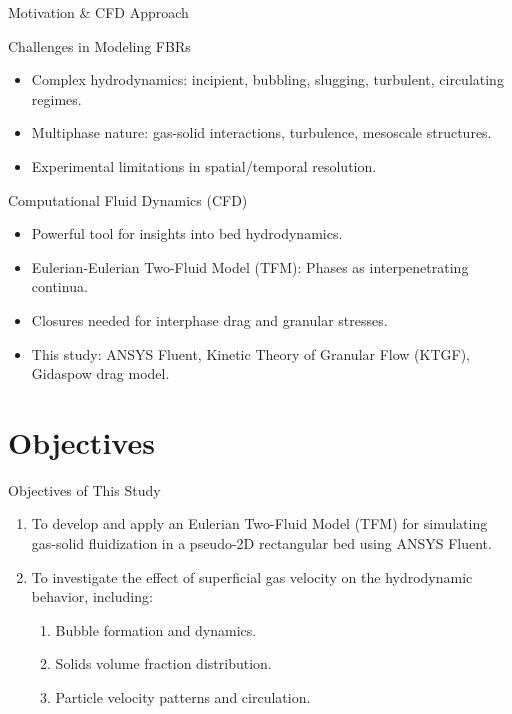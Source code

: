 \documentclass[aspectratio=169]{beamer} %
\newcommand{\bi}{\begin{itemize}}
\newcommand{\ei}{\end{itemize}}
\newcommand{\ben}{\begin{enumerate}}
\newcommand{\een}{\end{enumerate}}
\newcommand{\im}{\item}
\begin{document}
\begin{frame}{Motivation \& CFD Approach}
    \begin{block}{Challenges in Modeling FBRs}
        \bi
            \im Complex hydrodynamics: incipient, bubbling, slugging, turbulent, circulating regimes.
            \im Multiphase nature: gas-solid interactions, turbulence, mesoscale structures.
            \im Experimental limitations in spatial/temporal resolution.
        \ei
    \end{block}
    \vspace{1em}
    \begin{block}{Computational Fluid Dynamics (CFD)}
        \bi
            \im Powerful tool for insights into bed hydrodynamics.
            \im Eulerian-Eulerian Two-Fluid Model (TFM): Phases as interpenetrating continua.
            \im Closures needed for interphase drag and granular stresses.
            \im This study: ANSYS Fluent, Kinetic Theory of Granular Flow (KTGF), Gidaspow drag model.
        \ei
    \end{block}
\end{frame}

\section{Objectives}
\begin{frame}{Objectives of This Study}
    \ben
        \im To develop and apply an Eulerian Two-Fluid Model (TFM) for simulating gas-solid fluidization in a pseudo-2D rectangular bed using ANSYS Fluent.
        \im To investigate the effect of superficial gas velocity on the hydrodynamic behavior, including:
            \ben
                \im Bubble formation and dynamics.
                \im Solids volume fraction distribution.
                \im Particle velocity patterns and circulation.
            \een
    \een
    \vspace{1em}
\end{frame}

\end{document}
